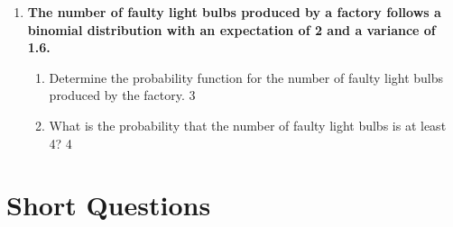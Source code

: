 \documentclass[a4paper,oneside]{book}
\begin{document}
\begin{enumerate}
  \begin{enumerate}
    \item
	What is the mean of binomial distribution \hfill 1
    \item
	Can variance be greater than mean in binomial distribution? \hfill 2
    \item  
	Determine the probability function of the number of defective items 
	produced by the company. \hfill 3
    \item
	What is the probability that the number of defective items is no
	less than 3? \hfill 4
  \end{enumerate}
  \item
	  \textbf{The number of faulty light bulbs produced by a factory 
	  follows a binomial distribution with an expectation of 2 and a 
	  variance of 1.6.} 
  
  \begin{enumerate}
    \item  
	Determine the probability function for the number of faulty light 
	bulbs produced by the factory. \hfill 3
    \item
	What is the probability that the number of faulty light bulbs is 
	at least 4? \hfill 4
  \end{enumerate}

  
  \end{enumerate}

\section{Short Questions}
\end{document}
